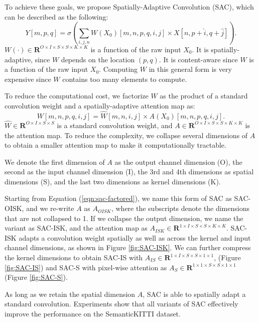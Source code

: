 \documentclass[runningheads]{llncs}
\begin{document}
To achieve these goals, we propose Spatially-Adaptive Convolution (SAC), which can be described as the following:
 \begin{equation}
    Y[m, p, q] = \sigma(\sum_{i,j,n}  W(X_0)[m,n,p,q,i,j] \times  X[n,p + \hat{i} , q+\hat{j}]) .
    \label{eqn:sac}
\end{equation}
$W(\cdot) \in \mathbf{R}^{O\times I\times S\times S\times K\times K}$ is a function of the raw input $X_0$.  It is spatially-adaptive, since $W$ depends on the location $(p, q)$. It is content-aware since $W$ is a function of the raw input $X_0$. Computing $W$ in this general form is very expensive since $W$ contains too many elements to compute.


To reduce the computational cost, we factorize $W$ as the product of a standard convolution weight and a spatially-adaptive attention map as:
\begin{equation}
W[m,n,p,q,i,j] = \hat{W}[m, n, i, j] \times A(X_0)[m, n, p, q, i, j].
\label{eqn:sac-factored}
\end{equation}
$\hat{W} \in \mathbf{R}^{O\times I\times S \times S}$ is a standard convolution weight, and $A \in \mathbf{R}^{O\times I\times S\times S\times K\times K}$ is the attention map. To reduce the complexity, we collapse several dimensions of $A$ to obtain a smaller attention map to make it computationally tractable. 

We denote the first dimension of $A$ as the output channel dimension (O), the second as the input channel dimension (I), the 3rd and 4th dimensions as spatial dimensions (S), and the last two dimensions as kernel dimensions (K). 

Starting from Equation (\ref{eqn:sac-factored}), we name this form of SAC as SAC-OISK, and we re-write $A$ as $A_{OISK}$, where the subscripts denote the dimensions that are not collapsed to 1. If we collapse the output dimension, we name the variant as SAC-ISK, and the attention map as $A_{ISK} \in \mathbf{R}^{1 \times I\times S\times S\times K\times K}$. SAC-ISK adapts a convolution weight spatially as well as across the kernel and input channel dimensions, as shown in Figure \ref{fig:SAC-ISK}. We can further compress the kernel dimensions to obtain SAC-IS with $A_{IS} \in \mathbf{R}^{1 \times I\times S\times S\times 1\times 1}$, (Figure \ref{fig:SAC-IS}) and SAC-S with pixel-wise attention as $A_{S} \in \mathbf{R}^{1 \times 1 \times S\times S\times 1\times 1}$ (Figure \ref{fig:SAC-S}). 



As long as we retain the spatial dimension $A$, SAC is able to spatially adapt a standard convolution. Experiments show that all variants of SAC effectively improve the performance on the SemanticKITTI dataset. 
\end{document}

